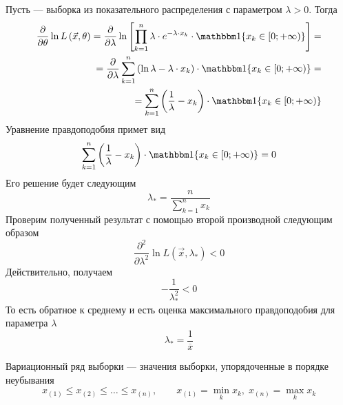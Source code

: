 \begin{example}
  Пусть \xsample --- выборка из показательного распределения с
  параметром $\lambda > 0$.
  Тогда
  \begin{align*}
    \frac{\partial}{\partial\theta} \ln{L\left( \vec{x}, \theta \right)} =
    \frac{\partial}{\partial \lambda} \ln{\left[ \prod_{k=1}^n \lambda
      \cdot e^{- \lambda \cdot x_k}
      \cdot \Indicator{x_k \in \left[ 0; + \infty \right)} \right]} = \\
    = \frac{\partial}{\partial \lambda} \sum_{k=1}^{n} \left( \ln{\lambda}
        - \lambda \cdot x_k \right)
      \cdot \Indicator{x_k \in \left[ 0; + \infty \right)} = \\
    = \sum_{k=1}^{n} \left( \frac{1}{\lambda} - x_k \right)
      \cdot \Indicator{x_k \in \left[ 0; + \infty \right)}
  \end{align*}
  Уравнение правдоподобия примет вид
  \begin{equation*}
    \sum_{k=1}^{n} \left( \frac{1}{\lambda} - x_k \right)
      \cdot \Indicator{x_k \in \left[ 0; + \infty \right)} = 0
  \end{equation*}
  Его решение будет следующим
  \begin{equation*}
    \lambda_* = \frac{n}{\sum_{k=1}^{n} x_k}
  \end{equation*}
  Проверим полученный результат с помощью второй производной следующим образом
  \begin{equation*}
    \frac{\partial^2}{\partial \lambda^2}
    \ln{L\left( \vec{x}, \lambda_* \right)} < 0
  \end{equation*}
  Действительно, получаем
  \begin{equation*}
    -\frac{1}{\lambda_*^2} < 0
  \end{equation*}
  То есть обратное к среднему и есть оценка максимального правдоподобия для
  параметра $\lambda$
  \begin{equation*}
    \lambda_* = \frac{1}{\overline{x}}
  \end{equation*}
\end{example}

\begin{definition}
  Вариационный ряд выборки \xsample --- значения выборки,
  упорядоченные в порядке неубывания
  \begin{equation*}
    x_{\left(1\right)} \le x_{\left(2\right)} \le \dots
      \le x_{\left(n\right)},\qquad
    x_{\left(1\right)}= \underset{k}\min{x_k},\;
    x_{\left(n\right)}= \underset{k}\max{x_k}
  \end{equation*}
\end{definition}

